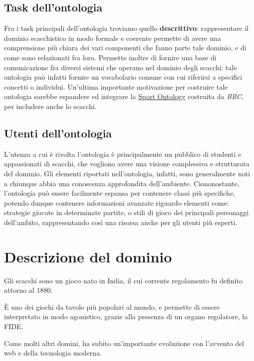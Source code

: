\documentclass[12pt]{book}
\begin{document}
\section{Task dell'ontologia}

Fra i task principali dell'ontologia troviamo quello
\textbf{descrittivo}: rappresentare il dominio scacchistico in modo
formale e coerente permette di avere una comprensione più chiara dei
vari componenti che fanno parte tale dominio, e di come sono
relazionati fra loro. Permette inoltre di fornire una base di
comunicazione fra diversi sistemi che operano nel dominio degli
scacchi: tale ontologia può infatti fornire un vocabolario comune con
cui riferirsi a specifici concetti o individui. Un'ultima importante 
motivazione per costruire tale ontologia sarebbe espandere ed
integrare la 
\href{https://www.bbc.co.uk/ontologies/sport-ontology/}{Sport Ontology} costruita da \textit{BBC}, per includere anche
lo scacchi.


\section{Utenti dell'ontologia}

L'utenza a cui è rivolta l'ontologia è principalmente un pubblico di
studenti e appassionati di scacchi, che vogliono avere una visione
complessiva e strutturata del dominio. Gli elementi riportati nell'ontologia,
infatti, sono generalmente noti a chiunque abbia una conoscenza
approfondita dell'ambiente. Ciononostante, l'ontologia può essere
facilmente espansa per contenere classi più specifiche,
potendo dunque contenere informazioni avanzate riguardo
elementi come: strategie giocate in determinate partite, o stili di
gioco dei principali personaggi dell'ambito, rappresentando così 
una risorsa anche per gli utenti più esperti.

\chapter{Descrizione del dominio}

Gli scacchi sono un gioco nato in India, il cui corrente regolamento 
fu definito attorno al 1880. 

È uno dei giochi da tavolo più popolari al mondo,
e permette di essere interpretato in modo agonistico,
grazie alla presenza di un organo regolatore, la FIDE.

Come molti altri domini, ha subito un'importante evoluzione con l'avvento del web e
della tecnologia moderna.
\end{document}

